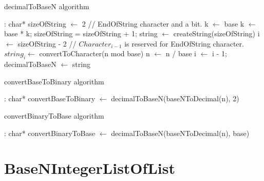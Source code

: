 \documentclass[book, nodocumentinfo]{upmethodology-document}
\begin{document}
\begin{algorithm}[H]
    \label{algo:basenintegerlist-decimal-to-base}
    \caption{decimalToBaseN algorithm}

    \begin{algorithmic}
         : char*
            \State sizeOfString \(\leftarrow\) 2 // EndOfString character and a bit.
            \State k \(\leftarrow\) base
                \State k \(\leftarrow\) base * k;
                \State sizeOfString = sizeOfString + 1;
            \EndWhile
            \State string \(\leftarrow\) createString(sizeOfString)
            \State i \(\leftarrow\) sizeOfString - 2 // \(Character_{i-1}\) is reserved for EndOfString character.
            \Repeat
                \State \(string_{i} \leftarrow \) convertToCharacter(n mod base)
                \State n \(\leftarrow\) n / base
                \State i \(\leftarrow\) i - 1;
            \State decimalToBaseN \(\leftarrow\) string
        \EndFunction
    \end{algorithmic}
\end{algorithm}

\begin{algorithm}[H]
    \label{algo:basenintegerlist-convert-base-to-binary}
    \caption{convertBaseToBinary algorithm}

    \begin{algorithmic}
         : char*
            \State convertBaseToBinary \(\leftarrow\) decimalToBaseN(baseNToDecimal(n), 2)
        \EndFunction
    \end{algorithmic}
\end{algorithm}

\begin{algorithm}[H]
    \label{algo:basenintegerlist-convert-binary-to-base}
    \caption{convertBinaryToBase algorithm}

    \begin{algorithmic}
         : char*
            \State convertBinaryToBase \(\leftarrow\) decimalToBaseN(baseNToDecimal(n), base)
        \EndFunction
    \end{algorithmic}
\end{algorithm}

\section{BaseNIntegerListOfList}
\end{document}
